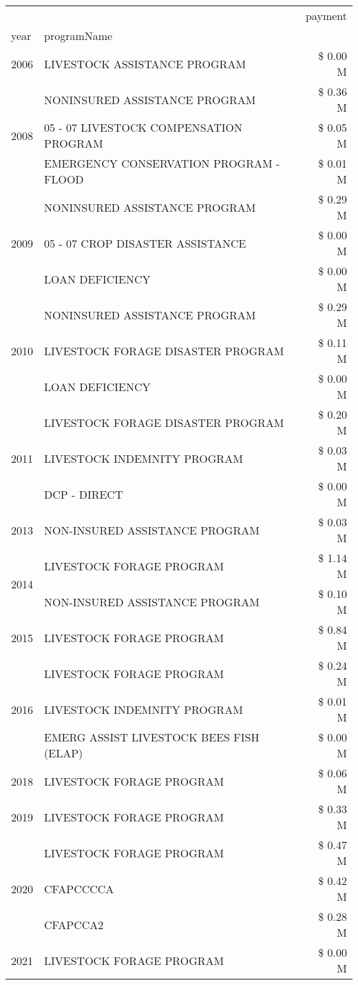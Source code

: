 \begin{tabular}{llr}
\toprule
 &  & payment \\
year & programName &  \\
\midrule
2006 & LIVESTOCK ASSISTANCE PROGRAM & \$ 0.00 M \\
\cline{1-3}
\multirow[t]{3}{*}{2008} & NONINSURED ASSISTANCE PROGRAM & \$ 0.36 M \\
 & 05 - 07 LIVESTOCK COMPENSATION PROGRAM & \$ 0.05 M \\
 & EMERGENCY CONSERVATION PROGRAM - FLOOD & \$ 0.01 M \\
\cline{1-3}
\multirow[t]{3}{*}{2009} & NONINSURED ASSISTANCE PROGRAM & \$ 0.29 M \\
 & 05 - 07 CROP DISASTER ASSISTANCE & \$ 0.00 M \\
 & LOAN DEFICIENCY & \$ 0.00 M \\
\cline{1-3}
\multirow[t]{3}{*}{2010} & NONINSURED ASSISTANCE PROGRAM & \$ 0.29 M \\
 & LIVESTOCK FORAGE DISASTER  PROGRAM & \$ 0.11 M \\
 & LOAN DEFICIENCY & \$ 0.00 M \\
\cline{1-3}
\multirow[t]{3}{*}{2011} & LIVESTOCK FORAGE DISASTER PROGRAM & \$ 0.20 M \\
 & LIVESTOCK INDEMNITY PROGRAM & \$ 0.03 M \\
 & DCP - DIRECT & \$ 0.00 M \\
\cline{1-3}
2013 & NON-INSURED ASSISTANCE PROGRAM & \$ 0.03 M \\
\cline{1-3}
\multirow[t]{2}{*}{2014} & LIVESTOCK FORAGE PROGRAM & \$ 1.14 M \\
 & NON-INSURED ASSISTANCE PROGRAM & \$ 0.10 M \\
\cline{1-3}
2015 & LIVESTOCK FORAGE PROGRAM & \$ 0.84 M \\
\cline{1-3}
\multirow[t]{3}{*}{2016} & LIVESTOCK FORAGE PROGRAM & \$ 0.24 M \\
 & LIVESTOCK INDEMNITY PROGRAM & \$ 0.01 M \\
 & EMERG ASSIST LIVESTOCK BEES FISH (ELAP) & \$ 0.00 M \\
\cline{1-3}
2018 & LIVESTOCK FORAGE PROGRAM & \$ 0.06 M \\
\cline{1-3}
2019 & LIVESTOCK FORAGE PROGRAM & \$ 0.33 M \\
\cline{1-3}
\multirow[t]{3}{*}{2020} & LIVESTOCK FORAGE PROGRAM & \$ 0.47 M \\
 & CFAPCCCCA & \$ 0.42 M \\
 & CFAPCCA2 & \$ 0.28 M \\
\cline{1-3}
2021 & LIVESTOCK FORAGE PROGRAM & \$ 0.00 M \\
\cline{1-3}
\bottomrule
\end{tabular}
